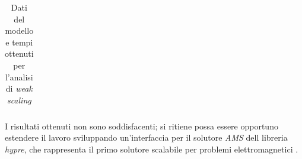 \begin{table}[p]
\begin{minipage}{0.45\textwidth}
\begin{tabular}{lc}
\bottomrule
\end{tabular}
\caption{Dati del modello e tempi ottenuti per l'analisi di \textit{weak scaling}}
\footnotesize
\label{tab:weakscaling}
\end{minipage}
\end{table}

I risultati ottenuti non sono soddisfacenti; si ritiene possa essere opportuno estendere il lavoro sviluppando un'interfaccia per il solutore \textit{AMS} dell libreria \textit{hypre}, che rappresenta il primo solutore scalabile per problemi elettromagnetici \citep{AMS_hypre}.